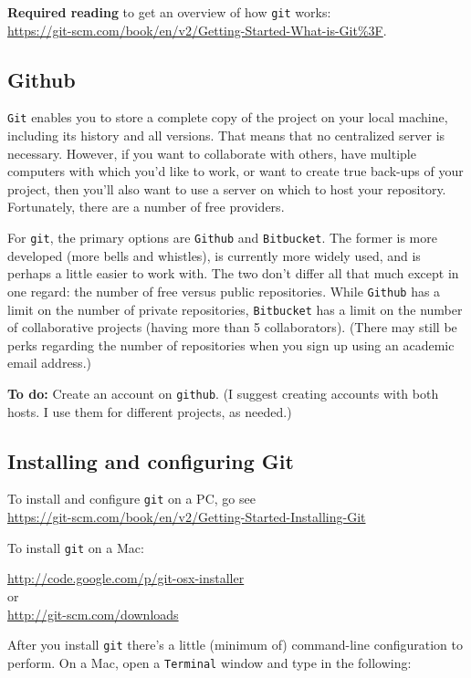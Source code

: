\documentclass[12pt,letterpaper]{article}
\begin{document}
\textbf{Required reading} to get an overview of how \texttt{git} works:\\
\url{https://git-scm.com/book/en/v2/Getting-Started-What-is-Git%3F}.

\subsection{Github}
\texttt{Git} enables you to store a complete copy of the project on your local machine, including its history and all versions.  That means that no centralized server is necessary.  However, if you want to collaborate with others, have multiple computers with which you'd like to work, or want to create true back-ups of your project, then you'll also want to use a server on which to host your repository.  Fortunately, there are a number of free providers. 

For \texttt{git}, the primary options are \texttt{Github} and \texttt{Bitbucket}.  The former is more developed (more bells and whistles), is currently more widely used, and is perhaps a little easier to work with.  The two don't differ all that much except in one regard:  the number of free versus public repositories.  While \texttt{Github} has a limit on the number of private repositories, \texttt{Bitbucket} has a limit on the number of collaborative projects (having more than 5 collaborators).  (There may still be perks regarding the number of repositories when you sign up using an academic email address.)

\textbf{To do:} Create an account on \texttt{github}.  (I suggest creating accounts with both hosts.  I use them for different projects, as needed.)


\subsection{Installing and configuring Git}
To install and configure \texttt{git} on a PC, go see \\
\url{https://git-scm.com/book/en/v2/Getting-Started-Installing-Git}

To install \texttt{git} on a Mac:

\url{http://code.google.com/p/git-osx-installer}\\
or\\
\url{http://git-scm.com/downloads}


After you install \texttt{git} there's a little (minimum of) command-line configuration to perform.  On a Mac, open a \texttt{Terminal} window and type in the following:
\end{document}
